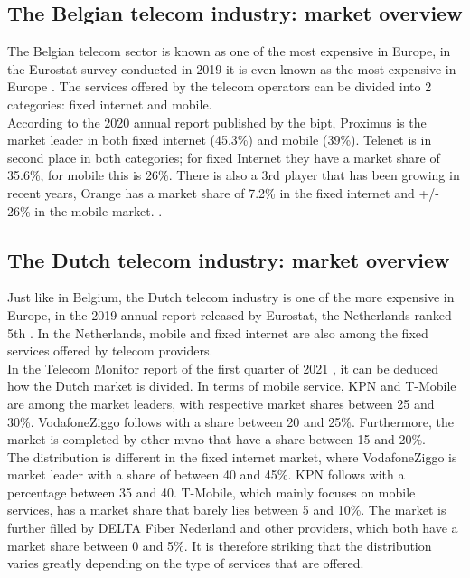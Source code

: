 \subsection{The Belgian telecom industry: market overview}
The Belgian telecom sector is known as one of the most expensive in Europe, in the Eurostat survey conducted in 2019 it is even known as the most expensive in Europe \citep{Eurostat2020}. The services offered by the telecom operators can be divided into 2 categories: fixed internet and mobile.\\
\break
According to the 2020 annual report published by the \acrfull{bipt}, Proximus is the market leader in both fixed internet (45.3\%) and mobile (39\%). Telenet is in second place in both categories; for fixed Internet they have a market share of 35.6\%, for mobile this is 26\%. There is also a 3rd player that has been growing in recent years, Orange has a market share of 7.2\% in the fixed internet and +/- 26\% in the mobile market. \citep*{BIPT2021,VanLeemputten2021}.\\

\subsection{The Dutch telecom industry: market overview}
Just like in Belgium, the Dutch telecom industry is one of the more expensive in Europe, in the 2019 annual report released by Eurostat, the Netherlands ranked 5th \citep{Eurostat2020}. In the Netherlands, mobile and fixed internet are also among the fixed services offered by telecom providers.\\
\break
In the Telecom Monitor report of the first quarter of 2021 \citep{Acm2021}, it can be deduced how the Dutch market is divided. In terms of mobile service, KPN and T-Mobile are among the market leaders, with respective market shares between 25 and 30\%. VodafoneZiggo follows with a share between 20 and 25\%. Furthermore, the market is completed by other \acrfull{mvno} that have a share between 15 and 20\%. \citep{Acm2021}\\
\break
The distribution is different in the fixed internet market, where VodafoneZiggo is market leader with a share of between 40 and 45\%. KPN follows with a percentage between 35 and 40. T-Mobile, which mainly focuses on mobile services, has a market share that barely lies between 5 and 10\%. The market is further filled by DELTA Fiber Nederland and other providers, which both have a market share between 0 and 5\%. It is therefore striking that the distribution varies greatly depending on the type of services that are offered. \citep{Acm2021}

